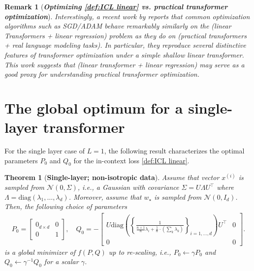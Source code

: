 \documentclass{article}
\newtheorem{theorem}{Theorem}
\newtheorem{remark}{Remark}
\newcommand{\wstar}{w_\star}
\newcommand{\tx}[1]{x^{(#1)}}
\newcommand{\emphh}[1]{\textbf{\emph{#1}}}
\begin{document}
\begin{remark}[\emphh{Optimizing \eqref{def:ICL linear} vs. practical transformer optimization}]
Interestingly, a recent work by \cite{ahn2023linear} reports that common optimization algorithms such as SGD/ADAM behave remarkably similarly on the (linear Transformers + linear regression) problem as they do on (practical transformers + real language modeling tasks).
In particular, they reproduce several distinctive features of transformer optimization under a simple shallow linear transformer. This work suggests that (linear transformer + linear regression) may serve as a good proxy for understanding practical transformer optimization. 
\end{remark}

 

\section{The global optimum for a single-layer transformer}
\label{sec:single}
For the single layer case of $L=1$, the following result characterizes the optimal parameters $P_0$ and $Q_0$ for the in-context loss \eqref{def:ICL linear}.  
 
\begin{theorem}
[\textbf{Single-layer; non-isotropic data}] \label{thm:main_single}
Assume that vector $\tx{i}$ is sampled from $\mathcal{N}(0, \Sigma)$, i.e., a Gaussian with covariance $\Sigma = U\Lambda U^\top$ where $\Lambda = \mathrm{diag}(\lambda_1,\dots, \lambda_d)$. 
Moreover, assume that  $\wstar$ is sampled  from $\mathcal{N}(0, I_d)$.  
Then, the following choice of parameters
\begin{align} \label{eq:single_layer}
P_0 = \begin{bmatrix}
0_{d\times d} & 0 \\ 
0 & 1 
\end{bmatrix} ,\quad Q_0 =  - \begin{bmatrix}
U \mathrm{diag}\left(\left\{\frac{1}{  \frac{n+1}{n}  \lambda_i +   \frac{1}{n} \cdot \left( \sum_k \lambda_k  \right)   } \right\}_{i=1,\dots,d}\right) U^\top & 0\\
0  & 0
\end{bmatrix} .
\end{align} 
is a  global minimizer of $f(P,Q)$ up to re-scaling, i.e., $P_0 \leftarrow \gamma P_0$ and $Q_0 \leftarrow \gamma^{-1} Q_0$ for a scalar $\gamma$.
\end{theorem}  
\end{document}
